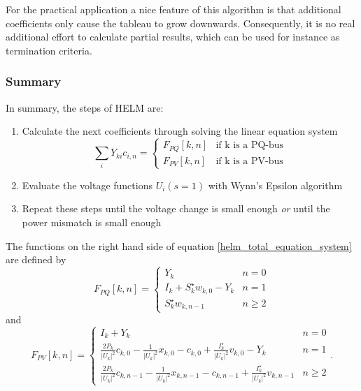 For the practical application a nice feature of this algorithm is that additional coefficients only cause the tableau to grow downwards. Consequently, it is no real additional effort to calculate partial results, which can be used for instance as termination criteria.

\subsubsection{Summary}
In summary, the steps of HELM are:
\begin{enumerate}
	\item Calculate the next coefficients through solving the linear equation system
	\begin{equation}
		\sum_i Y_{ki} c_{i,n} = 
		\begin{cases}
			F_{PQ}[k,n] & \text{if k is a PQ-bus} \\
			F_{PV}[k,n] & \text{if k is a PV-bus}
		\end{cases}
		\label{eq:helm_total_equation_system}
	\end{equation}
	\item Evaluate the voltage functions $U_i(s = 1)$ with Wynn's Epsilon algorithm
	\item Repeat these steps until the voltage change is small enough \emph{or} until the power mismatch is small enough
\end{enumerate}

The functions on the right hand side of equation \eqref{helm_total_equation_system} are defined by
\begin{equation}
	F_{PQ}[k,n] = 
	\begin{cases}
		Y_k & n = 0 \\
		I_k + S_k^\star w_{k,0} - Y_k & n = 1 \\
		S_k^\star w_{k,n - 1} & n \ge 2
	\end{cases}
\end{equation}
and
\begin{equation}
	F_{PV}[k,n] = 
	\begin{cases}
		I_k + Y_k & n = 0 \\
		\frac{2 P_k}{|U_k|^2} c_{k,0} - \frac{1}{|U_k|^2} x_{k,0} - c_{k,0} + \frac{I_k^\star}{|U_k|^2} v_{k,0} - Y_k & n = 1 \\
		\frac{2 P_k}{|U_k|^2} c_{k,n-1} - \frac{1}{|U_k|^2} x_{k,n-1} - c_{k,n-1} + \frac{I_k^\star}{|U_k|^2} v_{k,n-1} & n \ge 2
	\end{cases}.
\end{equation}

